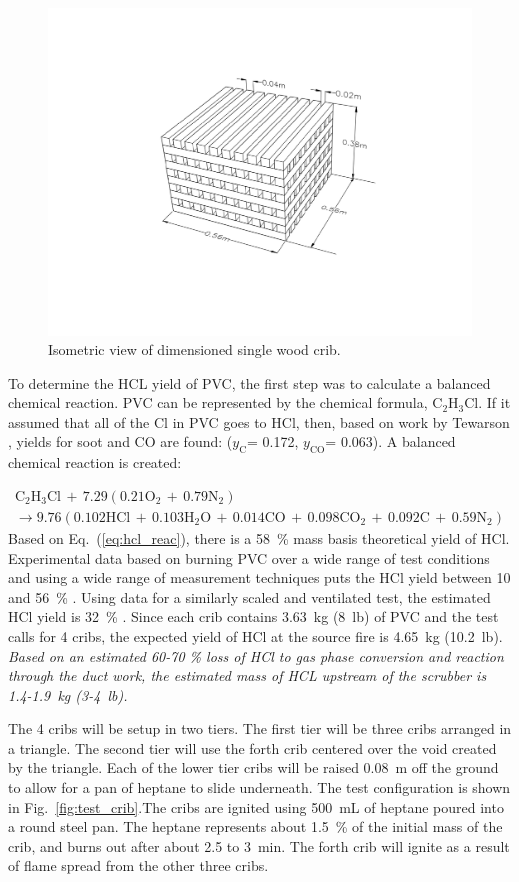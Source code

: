 \documentclass[12pt,oneside]{book}
\renewcommand{\C}{\mbox{C}}
\renewcommand{\H}{\mbox{H}}
\renewcommand{\O}{\mbox{O}}
\newcommand{\N}{\mbox{N}}
\newcommand{\Cl}{\mbox{Cl}}
\newcommand{\HCl}{\mbox{HCl}}
\begin{document}
\begin{figure}
\centering
\includegraphics[width=.75\textwidth]{../Figures/Wood_Cribs}
\caption {Isometric view of dimensioned single wood crib.}
\label{fig:wood_crib}
\end{figure}

To determine the HCL yield of PVC, the first step was to calculate a balanced chemical reaction. PVC can be represented by the chemical formula, $\C_2\H_3\Cl$. If it assumed that all of the Cl in PVC goes to HCl, then, based on work by Tewarson \cite{SFPE:Tewarson}, yields for soot and CO are found: ($y_{\mathrm{C}}$= 0.172, $y_{\mathrm{CO}}$= 0.063). A balanced chemical reaction is created:

\begin{multline}
\C_2\H_3\Cl \,+\, 7.29(0.21 \O_2 \,+\, 0.79 \N_2) \\
\rightarrow 9.76(0.102\HCl \,+\, 0.103\H_2\O \,+\, 0.014 \C\O \,+\, 0.098 \C\O_2 \,+\, 0.092 \C \,+\, 0.59 \N_2)
\label{eq:hcl_reac}
\end{multline}
Based on Eq.~(\ref{eq:hcl_reac}), there is a 58~\% mass basis theoretical yield of HCl.  Experimental data based on burning PVC over a wide range of test conditions and using a wide range of measurement techniques puts the HCl yield between 10 and 56~\% \cite{Leeds:PVC}. Using data for a similarly scaled and ventilated test, the estimated HCl yield is 32~\% \cite{Persson1998}. Since each crib contains 3.63~kg (8~lb) of PVC and the test calls for 4 cribs, the expected yield of HCl at the source fire is 4.65~kg (10.2~lb). {\em Based on an estimated 60-70 \% loss of HCl to gas phase conversion and reaction through the duct work, the estimated mass of HCL upstream of the scrubber is 1.4-1.9~kg (3-4~lb).}

The 4 cribs will be setup in two tiers. The first tier will be three cribs arranged in a triangle. The second tier will use the forth crib centered over the void created by the triangle. Each of the lower tier cribs will be raised 0.08~m off the ground to allow for a pan of heptane to slide underneath. The test configuration is shown in Fig.~\ref{fig:test_crib}.The cribs are ignited using 500~mL of heptane poured into a round steel pan. The heptane represents about 1.5~\% of the initial mass of the crib, and burns out after about 2.5 to 3~min. The forth crib will ignite as a result of flame spread from the other three cribs.
\end{document}
